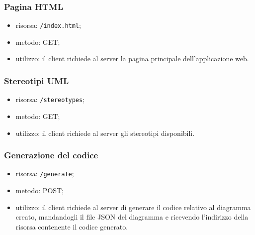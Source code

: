 \subsubsection{Pagina HTML}
\begin{itemize}
	\item risorsa: \texttt{/index.html};
	\item metodo: GET;
	\item utilizzo: il client richiede al server la pagina principale dell'applicazione web.
\end{itemize}

\subsubsection{Stereotipi UML}
\begin{itemize}
	\item risorsa: \texttt{/stereotypes};
	\item metodo: GET;
	\item utilizzo: il client richiede al server gli stereotipi disponibili.
\end{itemize}

\subsubsection{Generazione del codice}
\begin{itemize}
	\item risorsa: \texttt{/generate};
	\item metodo: POST;
	\item utilizzo: il client richiede al server di generare il codice relativo al diagramma creato, mandandogli il file JSON del diagramma e ricevendo l'indirizzo della risorsa contenente il codice generato.
\end{itemize}

